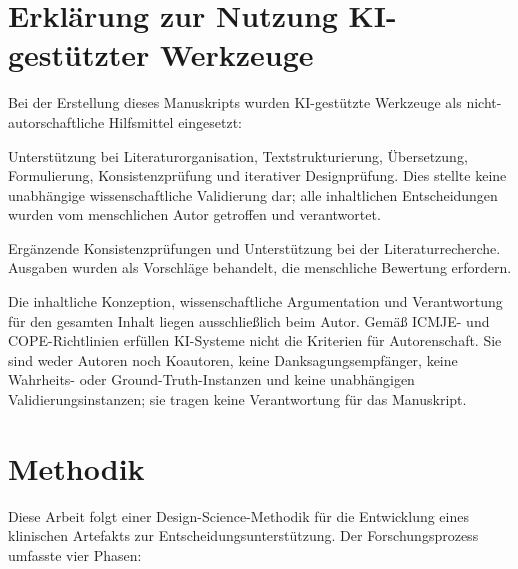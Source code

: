 \documentclass[11pt,a4paper]{article}
\begin{document}
\newpage
\tableofcontents
\newpage

\section*{Erkl\"arung zur Nutzung KI-gest\"utzter Werkzeuge}

Bei der Erstellung dieses Manuskripts wurden KI-gest\"utzte Werkzeuge als nicht-autorschaftliche Hilfsmittel eingesetzt:

\begin{description}[style=nextline, leftmargin=2cm]
\item[\textbf{Claude Opus 4.6} (Anthropic)] Unterst\"utzung bei Literaturorganisation, Textstrukturierung, \"Ubersetzung, Formulierung, Konsistenzpr\"ufung und iterativer Designpr\"ufung. Dies stellte keine unabh\"angige wissenschaftliche Validierung dar; alle inhaltlichen Entscheidungen wurden vom menschlichen Autor getroffen und verantwortet.
\item[\textbf{Gemini} (Google DeepMind) \& \textbf{Copilot} (Microsoft)] Erg\"anzende Konsistenzpr\"ufungen und Unterst\"utzung bei der Literaturrecherche. Ausgaben wurden als Vorschl\"age behandelt, die menschliche Bewertung erfordern.
\end{description}

\noindent Die inhaltliche Konzeption, wissenschaftliche Argumentation und Verantwortung f\"ur den gesamten Inhalt liegen ausschlie\ss{}lich beim Autor. Gem\"a\ss{} ICMJE- und COPE-Richtlinien erf\"ullen KI-Systeme nicht die Kriterien f\"ur Autorenschaft. Sie sind weder Autoren noch Koautoren, keine Danksagungsempf\"anger, keine Wahrheits- oder Ground-Truth-Instanzen und keine unabh\"angigen Validierungsinstanzen; sie tragen keine Verantwortung f\"ur das Manuskript.

\newpage

\section{Methodik}

Diese Arbeit folgt einer Design-Science-Methodik f\"ur die Entwicklung eines klinischen Artefakts zur Entscheidungsunterst\"utzung. Der Forschungsprozess umfasste vier Phasen:
\end{document}

